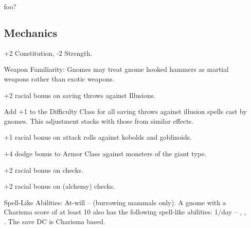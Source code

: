 
foo?

\subsection{Mechanics}

\begin{itemize*}
\item {}
\item {}
\item {}
\item {}
\item +2 Constitution, -2 Strength.
\item Weapon Familiarity: Gnomes may treat gnome hooked hammers as martial weapons rather than exotic weapons.
\item +2 racial bonus on saving throws against Illusions.
\item Add +1 to the Difficulty Class for all saving throws against illusion spells cast by gnomes. This adjustment stacks with those from similar effects.
\item +1 racial bonus on attack rolls against kobolds and goblinoids.
\item +4 dodge bonus to Armor Class against monsters of the giant type.
\item +2 racial bonus on  checks.
\item +2 racial bonus on  (alchemy) checks.
\item Spell-Like Abilities: At-will --  (burrowing mammals only). A gnome with a Charisma score of at least 10 also has the following spell-like abilities: 1/day -- , , . The save DC is Charisma based.
\item {}
\item {}
\item {}
\end{itemize*}

